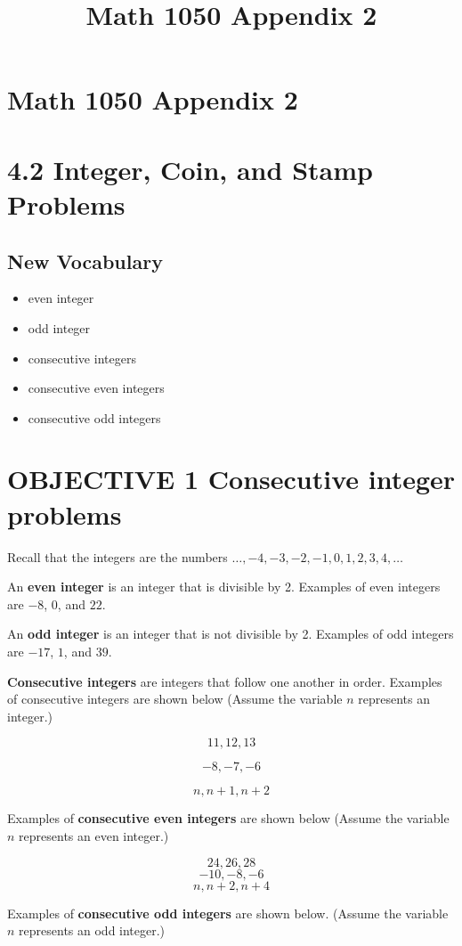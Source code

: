 \documentclass{ximera}
\title{Math 1050 Appendix 2}
\begin{document}
\section*{Math 1050 Appendix 2}

\section*{4.2 Integer, Coin, and Stamp Problems}

\subsection*{New Vocabulary}
\begin{itemize}
  \item even integer
  \item odd integer
  \item consecutive integers
  \item consecutive even integers
  \item consecutive odd integers
\end{itemize}

\section*{OBJECTIVE 1 Consecutive integer problems}

Recall that the integers are the numbers $\ldots, -4, -3, -2, -1, 0, 1, 2, 3, 4, \ldots$

An \textbf{even integer} is an integer that is divisible by 2. Examples of even integers are $-8$, $0$, and $22$.

An \textbf{odd integer} is an integer that is not divisible by 2. Examples of odd integers are $-17$, $1$, and $39$.

\textbf{Consecutive integers} are integers that follow one another in order. Examples of consecutive integers are shown below (Assume the variable $n$ represents an integer.)

$$11, 12, 13$$

$$-8, -7, -6$$

$$n, n+1, n+2$$

Examples of \textbf{consecutive even integers} are shown below (Assume the variable $n$ represents an even integer.)


$$24, 26, 28$$
$$-10, -8, -6$$
$$n, n+2, n+4$$

Examples of \textbf{consecutive odd integers} are shown below. (Assume the variable $n$ represents an odd integer.)
\end{document}
